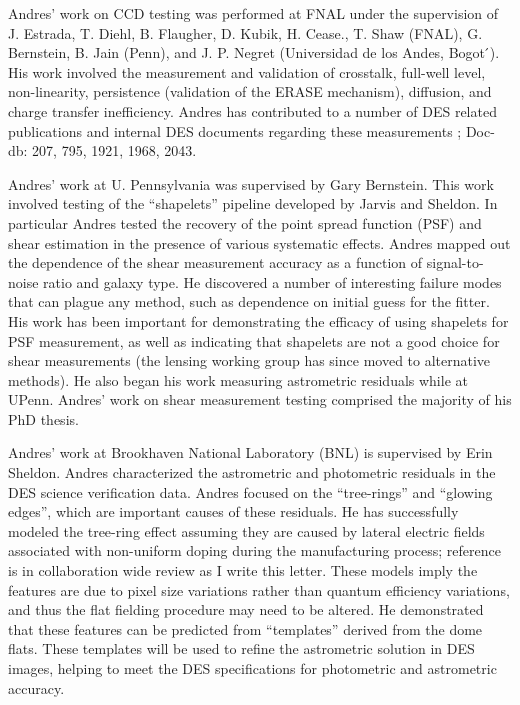 \documentclass[12pt]{letter}
\begin{document}
\begin{letter}{}
Andres' work on CCD testing was performed at FNAL under the supervision of J.
Estrada, T. Diehl, B. Flaugher, D. Kubik, H. Cease., T. Shaw (FNAL), G.
Bernstein, B. Jain (Penn), and J. P. Negret (Universidad de los Andes, Bogot ́).
His work involved the measurement and validation of crosstalk, full-well level,
non-linearity, persistence (validation of the ERASE mechanism), diffusion, and
charge transfer inefficiency.  Andres has contributed to a number of DES
related publications and internal DES documents regarding these measurements
\cite{Diehl2008,Flaugher2010,Flaugher2012}; Doc-db: 207, 795, 1921, 1968, 2043.

Andres' work at U. Pennsylvania was supervised by Gary Bernstein.  This work
involved testing of the ``shapelets'' pipeline developed by Jarvis and Sheldon.
In particular Andres tested the recovery of the point spread function (PSF) and
shear estimation in the presence of various systematic effects.  Andres mapped
out the dependence of the shear measurement accuracy as a function of
signal-to-noise ratio and galaxy type.  He discovered a number of interesting
failure modes that can plague any method, such as dependence on initial guess
for the fitter. His work has been important for demonstrating the efficacy of
using shapelets for PSF measurement, as well as indicating that shapelets are
not a good choice for shear measurements (the lensing working group has since
moved to alternative methods).  He also began his work measuring astrometric
residuals while at UPenn.  Andres' work on shear measurement testing
comprised the majority of his PhD thesis.

Andres' work at Brookhaven National Laboratory (BNL) is supervised by Erin
Sheldon.  Andres characterized the astrometric and photometric residuals in the
DES science verification data. Andres focused on the ``tree-rings'' and
``glowing edges'', which are important causes of these residuals. He has
successfully modeled the tree-ring effect assuming they are caused by lateral
electric fields associated with non-uniform doping during the manufacturing
process\cite{PlazasProceedings2014,Plazas2014}; reference \cite{Plazas2014} is
in collaboration wide review as I write this letter.  These models imply the
features are due to pixel size variations rather than quantum efficiency
variations, and thus the flat fielding procedure may need to be altered.  He
demonstrated that these features can be predicted from ``templates'' derived
from the dome flats.  These templates will be used to refine the astrometric
solution in DES images, helping to meet the DES specifications for photometric
and astrometric accuracy.


\end{letter}
\end{document}

